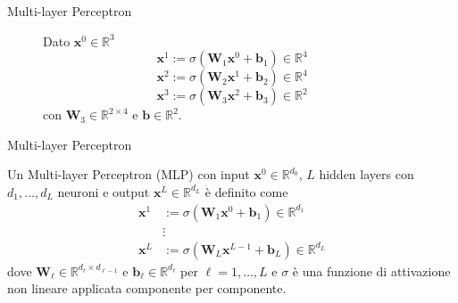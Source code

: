 \documentclass[aspectratio=169]{beamer}
\newcommand{\numberset}{\mathbb}
\newcommand{\R}{\numberset{R}}
\begin{document}
\begin{frame}{Multi-layer Perceptron}
\begin{figure}
\begin{minipage}{0.65\textwidth}
%
        \end{minipage}%
        \hfill
        \begin{minipage}{0.35\textwidth}
            Dato $\mathbf{x}^{0} \in \R^{3}$
            \[
                \mathbf{x}^{1} := \sigma\left( \mathbf{W}_{1} \mathbf{x}^{0} + \mathbf{b}_{1} \right) \in \R^{4}
            \]
            \[
                \mathbf{x}^{2} := \sigma\left( \mathbf{W}_{2} \mathbf{x}^{1} + \mathbf{b}_{2} \right) \in \R^{4}
            \]
            \[
                \mathbf{x}^{3} := \sigma\left( \mathbf{W}_{3} \mathbf{x}^{2} + \mathbf{b}_{3} \right) \in \R^{2}
            \]
            con $\mathbf{W}_{3}\in \R^{2\times 4}$ e $\mathbf{b}\in \R^{2}$.
        \end{minipage}
    \end{figure}
\end{frame}

\begin{frame}{Multi-layer Perceptron}
    \begin{definition}
        Un Multi-layer Perceptron (MLP) con input $\mathbf{x}^{0}\in \R^{d_{0}}$, $L$ hidden layers con $d_{1}, \ldots, d_{L}$ neuroni e output $\mathbf{x}^{L}\in \R^{d_{L}}$ è definito come
        \begin{align*}
            \mathbf{x}^{1} & := \sigma\left( \mathbf{W}_{1} \mathbf{x}^{0} + \mathbf{b}_{1} \right) \in \R^{d_{1}}   \\
                           & \vdots                                                                                  \\
            \mathbf{x}^{L} & := \sigma\left( \mathbf{W}_{L} \mathbf{x}^{L-1} + \mathbf{b}_{L} \right) \in \R^{d_{L}}
        \end{align*}
        dove $\mathbf{W}_{\ell}\in \R^{d_{\ell}\times d_{\ell-1}}$ e $\mathbf{b}_{\ell}\in \R^{d_{\ell}}$ per $\ell=1,\ldots, L$ e $\sigma$ è una funzione di attivazione non lineare applicata componente per componente.
    \end{definition}
\end{frame}
\end{document}
